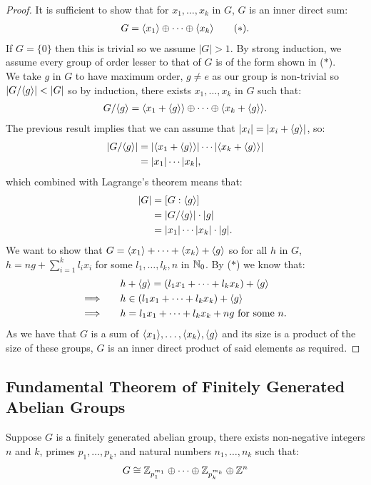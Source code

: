 \begin{proof}
    It is sufficient to show that for $x_1, \ldots, x_k$ in $G$, $G$
    is an inner direct sum: \begin{align*}
        G = \langle x_1 \rangle \oplus \cdots \oplus \langle x_k \rangle \tag{$\ast$}.
    \end{align*} If $G = \{0\}$ then this is trivial so we assume $|G| > 1$.
    By strong induction, we assume every group of order lesser to that of
    $G$ is of the form shown in ($\ast$).
    \\[\baselineskip]
    We take $g$ in $G$ to have maximum order, $g \neq e$ as our group is
    non-trivial so $|G / \langle g \rangle| < |G|$ so by induction, there exists
    $x_1, \ldots, x_k$ in $G$ such that: \begin{align*}
        G / \langle g \rangle = \langle x_1 + \langle g \rangle \rangle \oplus \cdots \oplus
        \langle x_k + \langle g \rangle \rangle.
    \end{align*} The previous result implies that we can assume that 
    $|x_i| = |x_i + \langle g \rangle|$, so: \begin{align*}
        |G/\langle g \rangle| 
        &= |\langle x_1 + \langle g \rangle \rangle| \cdots |\langle x_k + \langle g \rangle \rangle| \\
        &= |x_1| \cdots |x_k|,
    \end{align*} which combined with Lagrange's theorem means that: \begin{align*}
        |G| &= [G : \langle g \rangle] \\
        &= |G / \langle g \rangle| \cdot |g| \\
        &= |x_1| \cdots |x_k| \cdot |g|.
    \end{align*} We want to show that $G = \langle x_1 \rangle + \cdots + \langle x_k \rangle + \langle g \rangle$
    so for all $h$ in $G$, $h = ng + \sum_{i = 1}^k l_ix_i$ for some
    $l_1, \ldots, l_k, n$ in $\mathbb{N}_0$. By ($\ast$) we know that: \begin{align*}
        &h + \langle g \rangle = (l_1x_1 + \cdots + l_kx_k) + \langle g \rangle \\
        \Longrightarrow \qquad&
        h \in (l_1x_1 + \cdots + l_kx_k) + \langle g \rangle \\
        \Longrightarrow \qquad&
        h = l_1x_1 + \cdots + l_kx_k + ng \text{ for some } n.
    \end{align*} As we have that $G$ is a sum of $\langle x_1 \rangle, \ldots, \langle x_k \rangle,
    \langle g \rangle$ and its size is a product of the size of these groups, $G$
    is an inner direct product of said elements as required.
\end{proof}

\subsection{Fundamental Theorem of Finitely Generated Abelian Groups}

Suppose $G$ is a finitely generated abelian group, there exists
non-negative integers $n$ and $k$, primes $p_1, \ldots, p_k$, and
natural numbers $n_1, \ldots, n_k$ such that: \begin{align*}
    G \cong \mathbb{Z}_{p_1^{m_1}} \oplus \cdots 
    \oplus \mathbb{Z}_{p_k^{m_k}} \oplus \mathbb{Z}^n
\end{align*}
